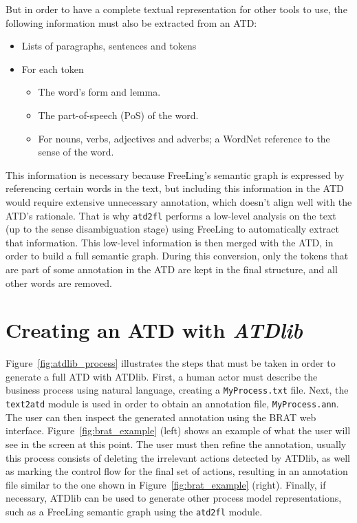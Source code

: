 But in order to have a complete textual representation for other tools to use,
the following information must also be extracted from an ATD:

\begin{itemize}
\item Lists of paragraphs, sentences and tokens
\item For each token \begin{itemize}
  \item The word's form and lemma.
  \item The part-of-speech (PoS) of the word.
  \item For nouns, verbs, adjectives and adverbs; a WordNet reference to the
    sense of the word.
  \end{itemize}
\end{itemize}

This information is necessary because FreeLing's semantic graph is expressed by
referencing certain words in the text, but including this information in
the ATD would require extensive unnecessary annotation, which doesn't align well
with the ATD's rationale. That is why \texttt{atd2fl} performs a low-level
analysis on the text (up to the sense disambiguation stage) using FreeLing to
automatically extract that information. This low-level information is then
merged with the ATD, in order to build a full semantic graph. During this
conversion, only the tokens that are part of some annotation in the ATD are kept
in the final structure, and all other words are removed.



\section{Creating an ATD with \emph{ATDlib}}
\label{sec:atdlib_tour}

Figure~\ref{fig:atdlib_process} illustrates the steps that must be taken in
order to generate a full ATD with ATDlib. First, a human actor must describe
the business process using natural language, creating a \texttt{MyProcess.txt}
file. Next, the \texttt{text2atd} module is used in order to obtain an
annotation file, \texttt{MyProcess.ann}. The user can then inspect the generated
annotation using the BRAT web interface. Figure~\ref{fig:brat_example} (left)
shows an example of what the user will see in the screen at this point. The user
must then refine the annotation, usually this process consists of deleting the
irrelevant actions detected by ATDlib, as well as marking the control flow for
the final set of actions, resulting in an annotation file similar to the one
shown in Figure~\ref{fig:brat_example} (right). Finally, if necessary, ATDlib
can be used to generate other process model representations, such as a FreeLing
semantic graph using the \texttt{atd2fl} module.

